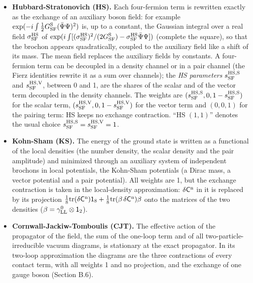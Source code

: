 \documentclass[
  10pt,
]{article}
\providecommand{\tightlist}{%
  \setlength{\itemsep}{0pt}\setlength{\parskip}{0pt}}
\begin{document}
\begin{itemize}
\tightlist
\item
  \textbf{Hubbard-Stratonovich (HS).} Each four-fermion term is
  rewritten exactly as the exchange of an auxiliary boson field: for
  example \(\exp(-i\int\tfrac12G^{\rm S}_{\rm SF}(\bar\Psi\Psi)^2)\) is,
  up to a constant, the Gaussian integral over a real field
  \(\sigma^{\rm HS}_{\rm SF}\) of
  \(\exp(i\int[(\sigma^{\rm HS}_{\rm SF})^2/(2G^{\rm S}_{\rm SF})-\sigma^{\rm HS}_{\rm SF}\bar\Psi\Psi])\)
  (complete the square), so that the brochon appears quadratically,
  coupled to the auxiliary field like a shift of its mass. The mean
  field replaces the auxiliary fields by constants. A four-fermion term
  can be decoupled in a density channel or in a pair channel (the Fierz
  identities rewrite it as a sum over channels); the \emph{HS
  parameters} \(s^{\rm HS,S}_{\rm SF}\) and \(s^{\rm HS,V}_{\rm SF}\),
  between 0 and 1, are the shares of the scalar and of the vector term
  decoupled in the density channels. The weights are
  \((s^{\rm HS,S}_{\rm SF},0,1-s^{\rm HS,S}_{\rm SF})\) for the scalar
  term, \((s^{\rm HS,V}_{\rm SF},0,1-s^{\rm HS,V}_{\rm SF})\) for the
  vector term and \((0,0,1)\) for the pairing term: HS keeps no exchange
  contraction. ``HS \((1,1)\)'' denotes the usual choice
  \(s^{\rm HS,S}_{\rm SF}=s^{\rm HS,V}_{\rm SF}=1\).
\item
  \textbf{Kohn-Sham (KS).} The energy of the ground state is written as
  a functional of the local densities (the number density, the scalar
  density and the pair amplitude) and minimized through an auxiliary
  system of independent brochons in local potentials, the Kohn-Sham
  potentials (a Dirac mass, a vector potential and a pair potential).
  All weights are 1, but the exchange contraction is taken in the
  local-density approximation: \(\delta\mathsf C^{\rm n}\) in it is
  replaced by its projection
  \(\tfrac18\mathrm{tr}(\delta\mathsf C^{\rm n})\mathsf 1_8+\tfrac18\mathrm{tr}(\beta\,\delta\mathsf C^{\rm n})\beta\)
  onto the matrices of the two densities
  (\(\beta=\gamma^0_{\rm LL}\otimes\mathsf 1_2\)).
\item
  \textbf{Cornwall-Jackiw-Tomboulis (CJT).} The effective action of the
  propagator of the field, the sum of the one-loop term and of all
  two-particle-irreducible vacuum diagrams, is stationary at the exact
  propagator. In its two-loop approximation the diagrams are the three
  contractions of every contact term, with all weights 1 and no
  projection, and the exchange of one gauge boson (Section B.6).
\end{itemize}
\end{document}
